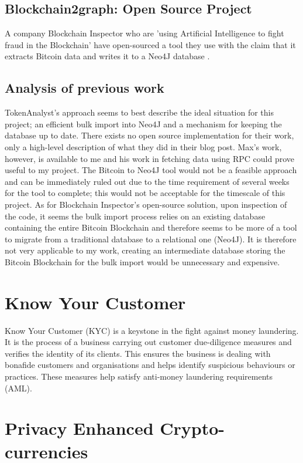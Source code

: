\subsection{Blockchain2graph: Open Source Project}
A company Blockchain Inspector who are 'using Artificial Intelligence to fight fraud in the Blockchain' have open-sourced a tool they use with the claim that it extracts Bitcoin data and writes it to a Neo4J database \cite{RefWorks:doc:5cac6184e4b01c076c63e173}.

\subsection{Analysis of previous work}
TokenAnalyst's approach seems to best describe the ideal situation for this project; an efficient bulk import into Neo4J and a mechanism for keeping the database up to date. There exists no open source implementation for their work, only a high-level description of what they did in their blog post. Max's work, however, is available to me and his work in fetching data using RPC could prove useful to my project. The Bitcoin to Neo4J tool would not be a feasible approach and can be immediately ruled out due to the time requirement of several weeks for the tool to complete; this would not be acceptable for the timescale of this project. As for Blockchain Inspector's open-source solution, upon inspection of the code, it seems the bulk import process relies on an existing database containing the entire Bitcoin Blockchain and therefore seems to be more of a tool to migrate from a traditional database to a relational one (Neo4J). It is therefore not very applicable to my work, creating an intermediate database storing the Bitcoin Blockchain for the bulk import would be unnecessary and expensive.

\section{Know Your Customer}\label{background-kyc}
Know Your Customer (KYC) is a keystone in the fight against money laundering. It is the process of a business carrying out customer due-diligence measures and verifies the identity of its clients. This ensures the business is dealing with bonafide customers and organisations and helps identify suspicious behaviours or practices. These measures help satisfy anti-money laundering requirements (AML). 

\section{Privacy Enhanced Crypto-currencies}
